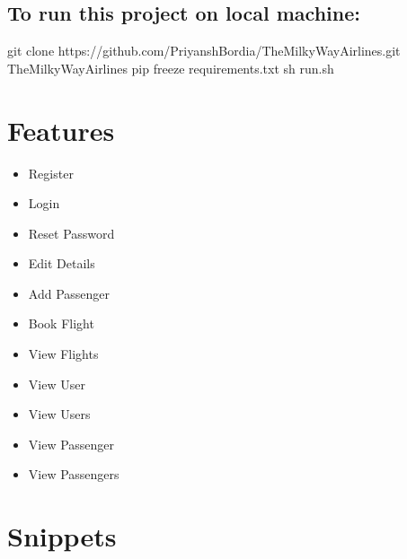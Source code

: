 \documentclass[letterpaper,10pt,english]{sphinxmanual}
\begin{document}
\subsection{To run this project on local machine:}
\label{\detokenize{index:to-run-this-project-on-local-machine}}
\begin{sphinxVerbatim}[commandchars=\\\{\}]
\PYGZdl{} git clone https://github.com/PriyanshBordia/The\PYGZhy{}MilkyWay\PYGZhy{}Airlines.git
\PYGZdl{}  The\PYGZhy{}MilkyWay\PYGZhy{}Airlines
\PYGZdl{} pip freeze \PYGZgt{} requirements.txt
\PYGZdl{} sh run.sh 
\end{sphinxVerbatim}


\section{Features}
\label{\detokenize{index:features}}\begin{itemize}
\item {} 
Register

\item {} 
Login

\item {} 
Reset Password

\item {} 
Edit Details

\item {} 
Add Passenger

\item {} 
Book Flight

\item {} 
View Flights

\item {} 
View User

\item {} 
View Users

\item {} 
View Passenger

\item {} 
View Passengers

\end{itemize}


\section{Snippets}
\label{\detokenize{index:snippets}}
\noindent{}

\noindent{}
\end{document}
